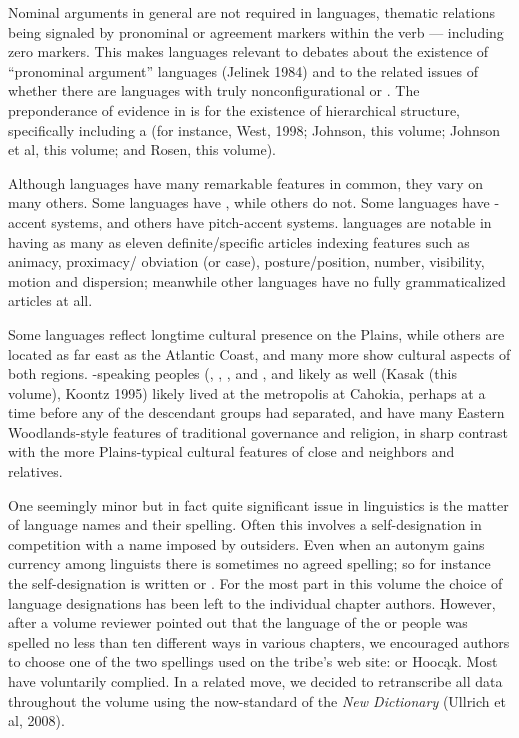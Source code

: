 \begin{refsection}
Nominal arguments in general are not required in  languages, thematic relations being signaled by pronominal or agreement markers within the verb --- including zero markers. This makes  languages relevant to debates about the existence of ``pronominal argument'' languages (Jelinek 1984) and to the related issues of whether there are languages with truly nonconfigurational or . The preponderance of evidence in  is for the existence of hierarchical structure, specifically including a  (for instance, West, 1998; Johnson, this volume; Johnson et al, this volume; and Rosen, this volume).


Although  languages have many remarkable features in common, they vary on many others.  Some  languages have , while others do not. Some  languages have -accent systems, and others have pitch-accent systems.  languages are notable in having as many as eleven definite/specific articles indexing features such as animacy, proximacy/ obviation (or case), posture/position, number, visibility, motion and dispersion; meanwhile other  languages have no fully grammaticalized articles at all.


Some  languages reflect longtime cultural presence on the Plains, while others are located as far east as the Atlantic Coast, and many more show cultural aspects of both regions. -speaking peoples (, , ,  and , and likely  as well (Kasak (this volume), Koontz 1995) likely lived at the metropolis at Cahokia, perhaps at a time before any of the descendant groups had separated, and have many Eastern Woodlands-style features of traditional governance and religion, in sharp contrast with the more Plains-typical cultural features of close  and  neighbors and relatives.

One seemingly minor but in fact quite significant issue in  linguistics is the matter of language names and their spelling. Often this involves a self-designation in competition with a name imposed by outsiders. Even when an autonym gains currency among linguists there is sometimes no agreed spelling; so for instance the  self-designation is written  or . For the most part in this volume the choice of language designations has been left to the individual chapter authors. However, after a volume reviewer pointed out that the language of the  or  people was spelled no less than ten different ways in various chapters, we encouraged authors to choose one of the two spellings used on the tribe's web site:   or Hooc\k{a}k.  Most have voluntarily complied.  In a related move, we decided to retranscribe all  data throughout the volume using the now-standard  of the \textit{New  Dictionary} (Ullrich et al, 2008).


\end{refsection}
